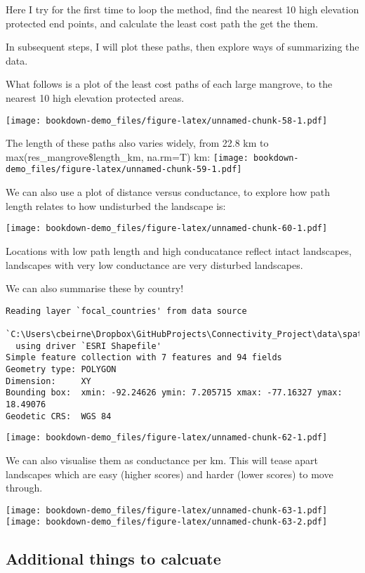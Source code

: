 \documentclass[
]{book}
\begin{document}
Here I try for the first time to loop the method, find the nearest 10 high elevation protected end points, and calculate the least cost path the get the them.

In subsequent steps, I will plot these paths, then explore ways of summarizing the data.

What follows is a plot of the least cost paths of each large mangrove, to the nearest 10 high elevation protected areas.

\texttt{[image: bookdown-demo\_files/figure-latex/unnamed-chunk-58-1.pdf]}

The length of these paths also varies widely, from 22.8 km to
max(res\_mangrove\$length\_km, na.rm=T) km:
\texttt{[image: bookdown-demo\_files/figure-latex/unnamed-chunk-59-1.pdf]}

We can also use a plot of distance versus conductance, to explore how path length relates to how undisturbed the landscape is:

\texttt{[image: bookdown-demo\_files/figure-latex/unnamed-chunk-60-1.pdf]}

Locations with low path length and high conducatance reflect intact landscapes, landscapes with very low conductance are very disturbed landscapes.

We can also summarise these by country!

\begin{verbatim}
Reading layer `focal_countries' from data source 
  `C:\Users\cbeirne\Dropbox\GitHubProjects\Connectivity_Project\data\spatial\area_of_interest\focal_countries.shp' 
  using driver `ESRI Shapefile'
Simple feature collection with 7 features and 94 fields
Geometry type: POLYGON
Dimension:     XY
Bounding box:  xmin: -92.24626 ymin: 7.205715 xmax: -77.16327 ymax: 18.49076
Geodetic CRS:  WGS 84
\end{verbatim}

\texttt{[image: bookdown-demo\_files/figure-latex/unnamed-chunk-62-1.pdf]}

We can also visualise them as conductance per km. This will tease apart landscapes which are easy (higher scores) and harder (lower scores) to move through.

\texttt{[image: bookdown-demo\_files/figure-latex/unnamed-chunk-63-1.pdf]} \texttt{[image: bookdown-demo\_files/figure-latex/unnamed-chunk-63-2.pdf]}

\hypertarget{additional-things-to-calcuate}{%
\subsection{Additional things to calcuate}\label{additional-things-to-calcuate}}
\end{document}
